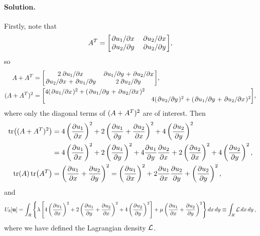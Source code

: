 \documentclass[11pt]{article}
\newcommand{\beq}{\begin{equation*}}
\newcommand{\eeq}{\end{equation*}}
\newcommand{\beqn}{\begin{equation}}
\newcommand{\eeqn}{\end{equation}}
\newenvironment{solution}
{
    \paragraph{Solution.}
    \ignorespaces
}
{
}
\begin{document}
\begin{solution}
	Firstly, note that
	\beq
		\AT = \mqty[ \pdv*{\uq}{x} & \pdv*{\uw}{x} \\
					\pdv*{\uw}{y} & \pdv*{\uw}{y} ],
	\eeq
	so
	\begin{align*}
		A + \AT &= \mqty[ 2 \pdv*{\uq}{x} & \pdv*{\uq}{y} + \pdv*{\uw}{x} \\
					\pdv*{\uw}{x} + \pdv*{\uq}{y} & 2 \pdv*{\uw}{y} ], \\
		(A + \AT)^2 &= \mqty[ 4 (\pdv*{\uq}{x})^2 + (\pdv*{\uq}{y} + \pdv*{\uw}{x})^2 & \\
					 & 4 (\pdv*{\uw}{y})^2 + (\pdv*{\uq}{y} + \pdv*{\uw}{x})^2 ],
	\end{align*}
	where only the diagonal terms of $(A + A^T)^2$ are of interest.  Then
	\begin{align*}
		\tr((A + A^T)^2) &= 4 \left( \pdv{u_1}{x} \right)^2 + 2 \left( \pdv{u_1}{y} + \pdv{u_2}{x} \right)^2 + 4 \left( \pdv{u_2}{y} \right)^2 \\
		&= 4 \left( \pdv{u_1}{x} \right)^2 + 2 \left( \pdv{u_1}{y} \right)^2 + 4 \pdv{u_1}{y} \pdv{u_2}{x} + 2 \left( \pdv{u_2}{x} \right)^2 + 4 \left( \pdv{u_2}{y} \right)^2, \\
		\tr(A) \tr(A^T) &= \left( \pdv{u_1}{x} + \pdv{u_2}{y} \right)^2 = \left( \pdv{u_1}{x} \right)^2 + 2 \pdv{u_1}{x} \pdv{u_2}{y} + \left( \pdv{u_2}{y} \right)^2,
	\end{align*}
	and
	\beqn \label{ld5}
		\Ub[\vvu] = \intr \left\{ \lam \left[ 4 \left( \pdv{\uq}{x} \right)^2 + 2 \left( \pdv{\uq}{y} + \pdv{\uw}{x} \right)^2 + 4 \left( \pdv{\uw}{y} \right)^2 \right] + \mu \left( \pdv{\uq}{x} + \pdv{\uw}{y} \right)^2 \right\} \dd{x} \dd{y} \equiv \intr \Ld \dd{x} \dd{y},
	\eeqn
	where we have defined the Lagrangian density $\mathcal{L}$.
	

\end{solution}
\end{document}
